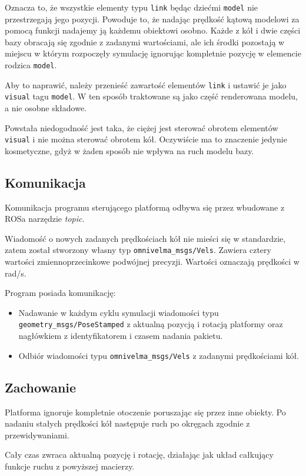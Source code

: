 		Oznacza to, że wszystkie elementy typu \texttt{link} będąc dziećmi \texttt{model} nie przestrzegają jego pozycji.
		Powoduje to, że nadając prędkość kątową modelowi za pomocą funkcji nadajemy ją każdemu obiektowi osobno.
		Każde z kół i dwie części bazy obracają się zgodnie z zadanymi wartościami, ale ich środki pozostają w miejscu w którym rozpoczęły symulację ignorując kompletnie pozycję w elemencie rodzica \texttt{model}.

		Aby to naprawić, należy przenieść zawartość elementów \texttt{link} i ustawić je jako \texttt{visual} tagu \texttt{model}.
		W ten sposób traktowane są jako część renderowana modelu, a nie osobne składowe.

		Powstała niedogodność jest taka, że ciężej jest sterować obrotem elementów \texttt{visual} i nie można sterować obrotem kół.
		Oczywiście ma to znaczenie jedynie kosmetyczne, gdyż w żaden sposób nie wpływa na ruch modelu bazy.

	\subsection{Komunikacja}
		Komunikacja programu sterującego platformą odbywa się przez wbudowane z ROSa narzędzie \emph{topic}.

		Wiadomość o nowych zadanych prędkościach kół nie mieści się w standardzie, zatem został stworzony własny typ \texttt{omnivelma\_msgs/Vels}.
		Zawiera cztery wartości zmiennoprzecinkowe podwójnej precyzji.
		Wartości oznaczają prędkości w rad/s.

		Program posiada komunikację:
		\begin{itemize}
		\item Nadawanie w każdym cyklu symulacji wiadomości typu \texttt{geometry\_msgs/PoseStamped} z aktualną pozycją i rotacją platformy oraz nagłówkiem z identyfikatorem i czasem nadania pakietu.
		\item Odbiór wiadomości typu \texttt{omnivelma\_msgs/Vels} z zadanymi prędkościami kół.
		\end{itemize}

	\subsection{Zachowanie}
		Platforma ignoruje kompletnie otoczenie poruszając się przez inne obiekty.
		Po nadaniu stałych prędkości kół następuje ruch po okręgach zgodnie z przewidywaniami.

		Cały czas zwraca aktualną pozycję i rotację, działając jak układ całkujący funkcje ruchu z powyższej macierzy.

